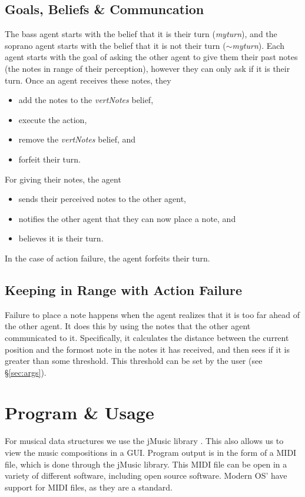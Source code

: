 \documentclass[12pt]{article}
\begin{document}
	\subsection{Goals, Beliefs \& Communcation}
	The bass agent starts with the belief that it is their turn ({\it myturn}), and the soprano agent starts with the belief that it is not their turn ({\it $\sim$myturn}).
	Each agent starts with the goal of asking the other agent to give them their past notes (the notes in range of their perception), however they can only ask if it is their turn. Once an agent receives these notes, they
	\begin{itemize}
		\item add the notes to the {\it vertNotes} belief,
		\item execute the action,
		\item remove the {\it vertNotes} belief, and
		\item forfeit their turn.
	\end{itemize}
	For giving their notes, the agent
	\begin{itemize}
		\item sends their perceived notes to the other agent,
		\item notifies the other agent that they can now place a note, and
		\item believes it is their turn.
	\end{itemize}
	In the case of action failure, the agent forfeits their turn.
	
	\subsection{Keeping in Range with Action Failure}
	Failure to place a note happens when the agent realizes that it is too far ahead of the other agent. It does this by using the notes that the other agent communicated to it. Specifically, it calculates the distance between the current position and the formost note in the notes it has received, and then sees if it is greater than some threshold. This threshold can be set by the user (see \S\ref{sec:args}).
	
	
	\section{Program \& Usage}
	For musical data structures we use the jMusic library \cite{jMusic}. This also allows us to view the music compositions in a GUI. Program output is in the form of a MIDI file, which is done through the jMusic library. This MIDI file can be open in a variety of different software, including open source software. Modern OS' have support for MIDI files, as they are a standard.
	
\end{document}
